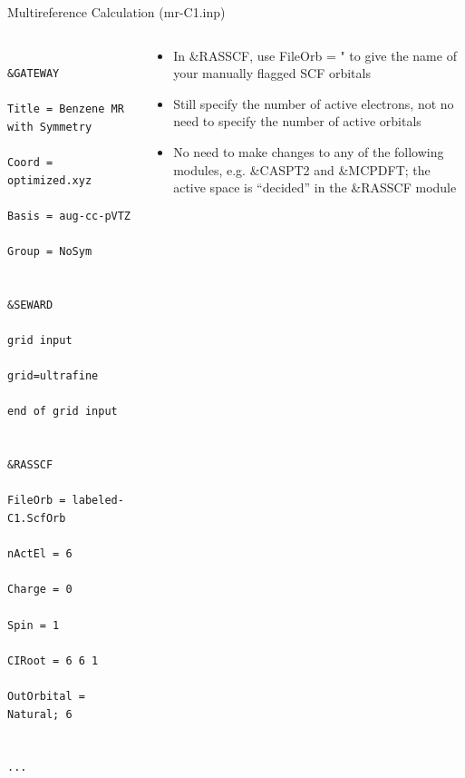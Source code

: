 \documentclass[12pt,aspectratio=169]{beamer}
\begin{document}
	\begin{frame}[fragile]{Multireference Calculation (mr-C1.inp)}
		\begin{columns}
			\begin{column}{.5\linewidth}
				\begin{scriptsize}
					\begin{verbatim}
					&GATEWAY
					Title = Benzene MR with Symmetry
					Coord = optimized.xyz
					Basis = aug-cc-pVTZ
					Group = NoSym
					
					&SEWARD
					grid input
					grid=ultrafine
					end of grid input
					
					&RASSCF
					FileOrb = labeled-C1.ScfOrb
					nActEl = 6
					Charge = 0
					Spin = 1
					CIRoot = 6 6 1
					OutOrbital = Natural; 6
					
					...
				\end{verbatim}
				\end{scriptsize}
			\end{column}
			\begin{column}{.5\linewidth}
				\begin{itemize}
					\item In \&RASSCF, use FileOrb = " to give the name of your manually flagged SCF orbitals
					\item Still specify the number of active electrons, not no need to specify the number of active orbitals
					\item No need to make changes to any of the following modules, e.g. \&CASPT2 and \&MCPDFT; the active space is ``decided'' in the \&RASSCF module
				\end{itemize}
			\end{column}
		\end{columns}
	\end{frame}
\end{document}
